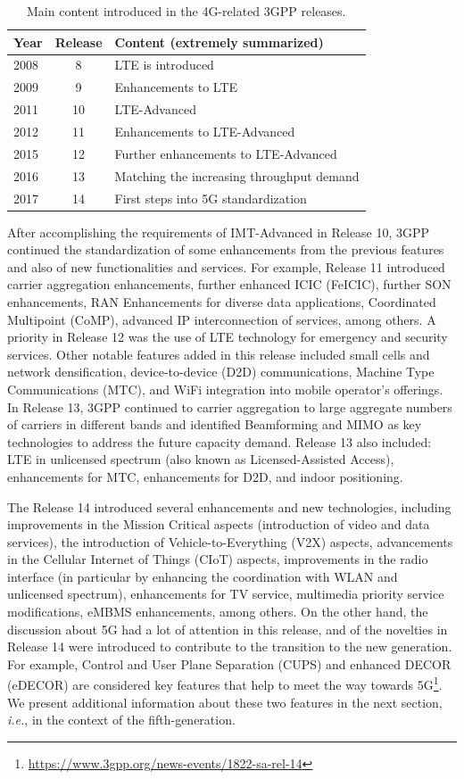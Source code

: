 \begin{table}[htb]
\centering
\begin{tabular}{lcl}
\hline
\textbf{Year}      & \textbf{Release}   & \textbf{Content (extremely summarized)}  \\ \hline
2008 & 8 & LTE is introduced \\
2009 & 9 & Enhancements to LTE \\
2011 & 10 & LTE-Advanced \\
2012 & 11 & Enhancements to LTE-Advanced \\
2015 & 12 & Further enhancements to LTE-Advanced \\
2016 & 13 & Matching the increasing throughput demand \\
2017 & 14 & First steps into 5G standardization \\ \hline
\end{tabular} 
\caption{Main content introduced in the 4G-related 3GPP releases.}
\label{tab:4g_rel}
\end{table}

After accomplishing the requirements of IMT-Advanced in Release 10, 3GPP continued the standardization of some enhancements from the previous features and also of new functionalities and services. For example, Release 11 introduced carrier aggregation enhancements, further enhanced ICIC (FeICIC), further SON enhancements, RAN Enhancements for diverse data applications, Coordinated Multipoint (CoMP), advanced IP interconnection of services, among others. A priority in Release 12 was the use of LTE technology for emergency and security services. Other notable features added in this release included small cells and network densification, device-to-device (D2D) communications, Machine Type Communications (MTC), and WiFi integration into mobile operator's offerings. In Release 13, 3GPP continued to carrier aggregation to large aggregate numbers of carriers in different bands and identified Beamforming and MIMO as key technologies to address the future capacity demand. Release 13 also included: LTE in unlicensed spectrum (also known as Licensed-Assisted Access), enhancements for MTC, enhancements for D2D, and indoor positioning.

The Release 14 introduced several enhancements and new technologies, including improvements in the Mission Critical aspects (introduction of video and data services), the introduction of Vehicle-to-Everything (V2X) aspects, advancements in the Cellular Internet of Things (CIoT) aspects, improvements in the radio interface (in particular by enhancing the coordination with WLAN and unlicensed spectrum), enhancements for TV service, multimedia priority service modifications, eMBMS enhancements, among others. On the other hand, the discussion about 5G had a lot of attention in this release, and of the novelties in Release 14 were introduced to contribute to the transition to the new generation. For example, Control and User Plane Separation (CUPS) and enhanced DECOR (eDECOR) are considered key features that help to meet the way towards 5G\footnote{\url{https://www.3gpp.org/news-events/1822-sa-rel-14}}. We present additional information about these two features in the next section, \textit{i.e.}, in the context of the fifth-generation. 

